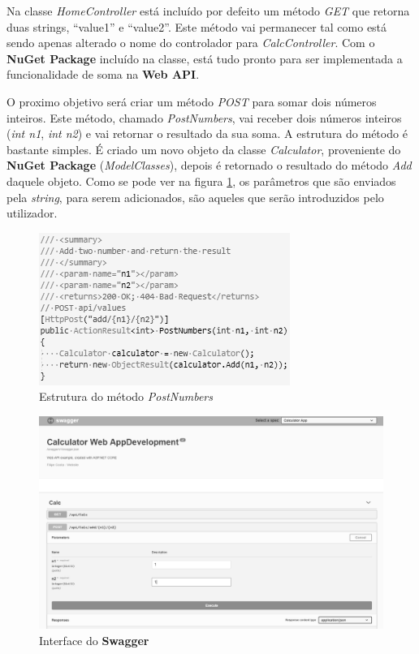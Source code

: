 \hspace{1cm}Na classe \textit{HomeController} está incluído por defeito um método \textit{GET} que retorna duas strings, ``value1'' e ``value2''. Este método vai permanecer tal como está sendo apenas alterado o nome do controlador para \textit{CalcController}. Com o \textbf{NuGet Package} incluído na classe, está tudo pronto para ser implementada a funcionalidade de soma na \textbf{Web API}. 

\hspace{1cm}O proximo objetivo será criar um método \textit{POST} para somar dois números inteiros. Este método, chamado \textit{PostNumbers}, vai receber dois números inteiros (\textit{int n1}, \textit{int n2}) e vai retornar o resultado da sua soma. A estrutura do método é bastante simples. É criado um novo objeto da classe \textit{Calculator}, proveniente do \textbf{NuGet Package} (\textit{ModelClasses}), depois é retornado o resultado do método \textit{Add} daquele objeto. Como se pode ver na figura \ref{Fig:Fig47}, os parâmetros que são enviados pela \textit{string}, para serem adicionados, são aqueles que serão introduzidos pelo utilizador.

\begin{figure}[hbt!]
\centering
\includegraphics[width=0.45\linewidth]{Cap5/VSPostNumbers.png}
\caption{Estrutura do método \textit{PostNumbers}}
\label{Fig:Fig47}
\end{figure}

\begin{figure}[hbt!]
\centering
\includegraphics[width=0.8\linewidth]{Cap5/Swagger1.png}
\caption{Interface do \textbf{Swagger}}
\label{Fig:Fig48}
\end{figure}

